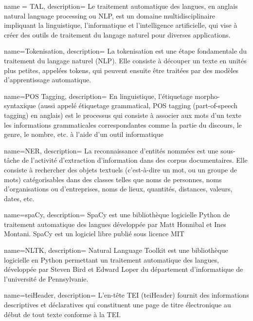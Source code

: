 {
    name = TAL,
    description={
    Le traitement automatique des langues, en anglais natural language processing ou NLP, est un domaine multidisciplinaire impliquant la linguistique, l'informatique et l'intelligence artificielle, qui vise à créer des outils de traitement du langage naturel pour diverses applications.
    }
}

{
    name=Tokenisation,
    description={
    La tokenisation est une étape fondamentale du traitement du langage naturel (NLP). Elle consiste à découper un texte en unités plus petites, appelées tokens, qui peuvent ensuite être traitées par des modèles d'apprentissage automatique.
    }
}

{
    name=POS Tagging,
    description={
    En linguistique, l'étiquetage morpho-syntaxique (aussi appelé étiquetage grammatical, POS tagging (part-of-speech tagging) en anglais) est le processus qui consiste à associer aux mots d'un texte les informations grammaticales correspondantes comme la partie du discours, le genre, le nombre, etc. à l'aide d'un outil informatique
    }
}

{
    name=NER,
    description={
    La reconnaissance d'entités nommées est une sous-tâche de l'activité d'extraction d'information dans des corpus documentaires. Elle consiste à rechercher des objets textuels (c'est-à-dire un mot, ou un groupe de mots) catégorisables dans des classes telles que noms de personnes, noms d'organisations ou d'entreprises, noms de lieux, quantités, distances, valeurs, dates, etc. 
    }
}

{
    name=spaCy,
    description={
    SpaCy est une bibliothèque logicielle Python de traitement automatique des langues développée par Matt Honnibal et Ines Montani. SpaCy est un logiciel libre publié sous licence MIT
    }
}

{
    name=NLTK,
    description={
    Natural Language Toolkit est une bibliothèque logicielle en Python permettant un traitement automatique des langues, développée par Steven Bird et Edward Loper du département d'informatique de l'université de Pennsylvanie.
    }
}


{
    name=teiHeader,
    description={
     L'en-tête TEI (teiHeader) fournit des informations descriptives et déclaratives qui constituent une page de titre électronique au début de tout texte conforme à la TEI.
    }
}

